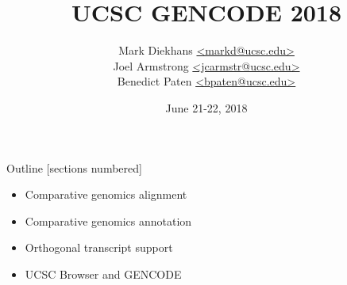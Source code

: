 \documentclass[10pt]{beamer}
\title{UCSC GENCODE 2018}
\date{June 21-22, 2018}
\author{
  Mark Diekhans \href{mailto:markd@ucsc.edu}{\textless markd@ucsc.edu\textgreater} \\
  Joel Armstrong \href{mailto:jcarmstr@ucsc.edu}{\textless jcarmstr@ucsc.edu\textgreater} \\
  Benedict Paten \href{mailto:bpaten@ucsc.edu}{\textless bpaten@ucsc.edu\textgreater}}
\begin{document}
\maketitle

\begin{frame}{Outline}
  [sections numbered]
  \tableofcontents[hideallsubsections]
  \begin{itemize}
  \item Comparative genomics alignment
  \item Comparative genomics annotation
  \item Orthogonal transcript support
  \item UCSC Browser and GENCODE
  \end{itemize}
\end{frame}
\end{document}
